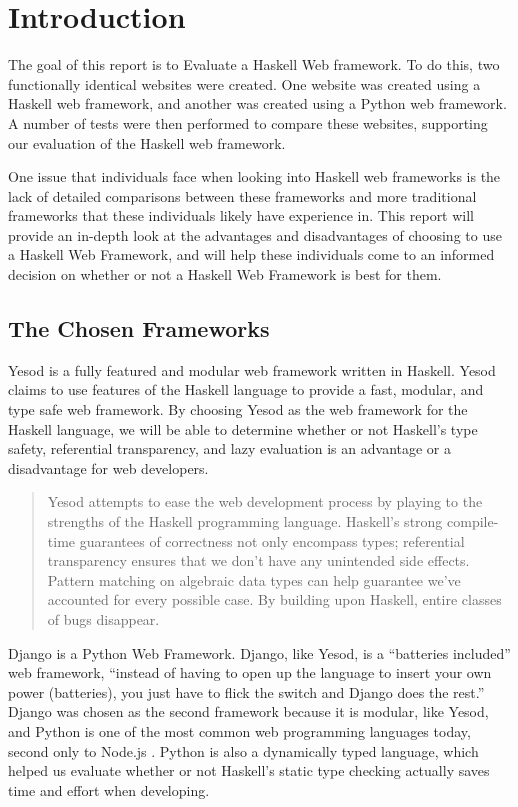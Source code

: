 \chapter{Introduction}
\label{chap:Introduction}

The goal of this report is to Evaluate a Haskell Web framework. To do this, two functionally
identical websites were created. One website was created using a Haskell web framework,
and another was created using a Python web framework. A number of tests were then performed
to compare these websites, supporting our evaluation of the Haskell web framework.

One issue that individuals face when looking into Haskell web frameworks is the lack of
detailed comparisons between these frameworks and more traditional frameworks that these
individuals likely have experience in. This report will provide an in-depth look at the
advantages and disadvantages of choosing to use a Haskell Web Framework, and will help
these individuals come to an informed decision on whether or not a Haskell Web Framework is
best for them.

\section{The Chosen Frameworks}

Yesod is a fully featured and modular web framework written in Haskell. Yesod claims to use
features of the Haskell language to provide a fast, modular, and type safe web framework. By
choosing Yesod as the web framework for the Haskell language, we will be able to determine
whether or not Haskell's type safety, referential transparency, and lazy evaluation is an advantage
or a disadvantage for web developers.

\begin{quote}
Yesod attempts to ease the web development process by playing to the strengths of the Haskell 
programming language. Haskell’s strong compile-time guarantees of correctness not only encompass 
types; referential transparency ensures that we don’t have any unintended side effects. Pattern 
matching on algebraic data types can help guarantee we’ve accounted for every possible case. 
By building upon Haskell, entire classes of bugs disappear. \parencite[Introduction]{yesodBook}
\end{quote}

Django is a Python Web Framework. Django, like Yesod, is a ``batteries included'' web framework,
``instead of having to open up the language to insert your own power (batteries), you just have
to flick the switch and Django does the rest.'' Django was chosen as the second framework
because it is modular, like Yesod, and Python is one of the most common web programming
languages today, second only to Node.js \parencite{djangoBookReasons}. Python is also a 
dynamically typed language, which helped us evaluate whether or not Haskell's static
type checking actually saves time and effort when developing.

